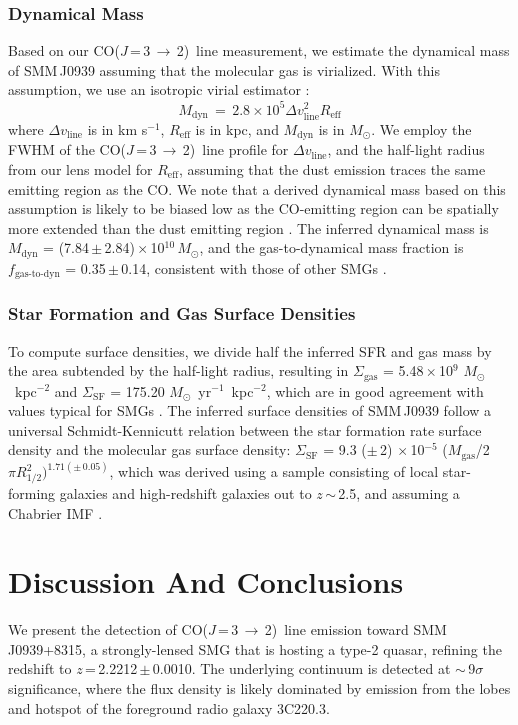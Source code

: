 \documentclass[twocolumn,apj,numberedappendix]{emulateapj}
\newcommand{\Msun}{\mbox{$M_{\odot}$}}
\newcommand{\CO}{\mbox{CO($J$\,=\,3\,$\rightarrow$\,2) }}
\newcommand{\eg}{{\sl e.g.,~}}
\newcommand{\pmOne}{\mbox{$^{-1}$}}
\begin{document}
\subsubsection{Dynamical Mass}
Based on our \CO line measurement, we estimate the dynamical mass of SMM\,J0939 assuming that the molecular gas is virialized. With this assumption, we use an isotropic virial estimator \citep[\eg][]{Engel10a}:
\begin{equation}
M_\textrm{dyn}\,=\,2.8\times 10^5\Delta v_\textrm{line}^ 2 R_\textrm{eff}
\end{equation}
where $\Delta v_\textrm{line}$ is in km\,\,s\pmOne, $R_\textrm{eff}$ is in kpc, and $M_\textrm{dyn}$ is in \Msun.
We employ the FWHM of the \CO line profile for $\Delta v_\textrm{line}$,
and the half-light radius from our lens model for $R_\textrm{eff}$, assuming that the dust emission traces the same emitting region as the CO. We note that a derived dynamical mass based on this assumption is likely to be biased low as the CO-emitting region can be spatially more extended than the dust emitting region \citep[\eg][]{Tacconi06a, Riechers11c,Riechers11d,Ivison11a}.
% 
The inferred dynamical mass is $M_\textrm{dyn}$ = (7.84\,$\pm$\,2.84)\,$\times$\,10$^{10}$\,\Msun, and the gas-to-dynamical mass fraction is $f_\textrm{gas-to-dyn}$ = 0.35\,$\pm$\,0.14, consistent with those of other SMGs \citep{Tacconi06a}.

\subsubsection{Star Formation and Gas Surface Densities}
To compute surface densities, we divide half the inferred SFR and gas mass by the area subtended by the half-light
radius, resulting in $\Sigma_\textrm{gas}$ = 5.48\,$\times$\,10$^9$ \Msun~kpc$^{-2}$ and $\Sigma_\textrm{SF}$ = 175.20 \Msun~yr\pmOne~kpc$^{-2}$, which are in good agreement with values typical for SMGs \citep{Tacconi08a}. 
The inferred surface densities of SMM\,J0939 follow a universal Schmidt-Kennicutt relation between the star formation rate
surface density and the molecular gas surface density: $\Sigma_\textrm{SF}$ = 9.3 ($\pm$\,2) $\times$\,10$^{-5}$ ($M_\textrm{gas}$/2$\pi R_\textrm{1/2}^2)^{1.71(\pm\,0.05)}$, which was derived using a sample consisting of local star-forming galaxies and high-redshift
galaxies
out to $z$\,$\sim$\,2.5, and assuming a Chabrier IMF \citep{B07a}.

\section{Discussion And Conclusions}

We present the detection of \CO line emission toward SMM\,J0939+8315, a strongly-lensed SMG that is hosting a type-2 quasar, refining the redshift
to $z$\,=\,2.2212\,$\pm$\,0.0010. The underlying continuum is detected at $\sim$\,9$\sigma$ significance, where the flux density is likely dominated by emission from the lobes and hotspot of the foreground radio galaxy 3C220.3.
\end{document}
